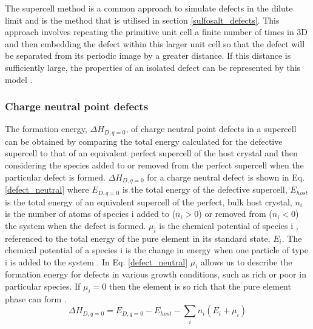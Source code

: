 \documentclass[11pt, twoside]{report}
\begin{document}
The supercell method is a common approach to simulate defects in the dilute limit and is the method that is utilised in section \ref{sulfosalt_defects}. This approach involves repeating the primitive unit cell a finite number of times in 3D and then embedding the defect within this larger unit cell so that the defect will be separated from its periodic image by a greater distance. If this distance is sufficiently large, the properties of an isolated defect can be represented by this model \cite{freysoldt_rev}.

\subsubsection{Charge neutral point defects}
The formation energy, $\Delta H_{D,q=0}$, of charge neutral point defects in a supercell can be obtained by comparing the total energy calculated for the defective supercell to that of an equivalent perfect supercell of the host crystal and then considering the species added to or removed from the perfect supercell when the particular defect is formed. $\Delta H_{D,q=0}$ for a charge neutral defect is shown in Eq. \ref{defect_neutral} where $E_{D,q=0}$ is the total energy of the defective supercell, $E_{host}$ is the total energy of an equivalent supercell of the perfect, bulk host crystal, $n_i$ is the number of atoms of species i added to ($n_i > 0 $) or removed from ($n_i < 0$) the system when the defect is formed. $\mu_i$ is the chemical potential of species i \cite{ZhangNorthup_defect_formation}, referenced to the total energy of the pure element in its standard state, $E_i$. The chemical potential of a species i is the change in energy when one particle of type i is added to the system \cite{chem_pot}. In Eq. \ref{defect_neutral} $\mu_i$ allows us to describe the formation energy for defects in various growth conditions, such as rich or poor in particular species. If $\mu_i = 0$ then the element is so rich that the pure element phase can form \cite{defects_Chen}.
\begin{equation}\label{defect_neutral}
\Delta H_{D,q=0} = E_{D,q=0} - E_{host} - \sum_i n_i (E_i + \mu_i )
\end{equation}
\end{document}
